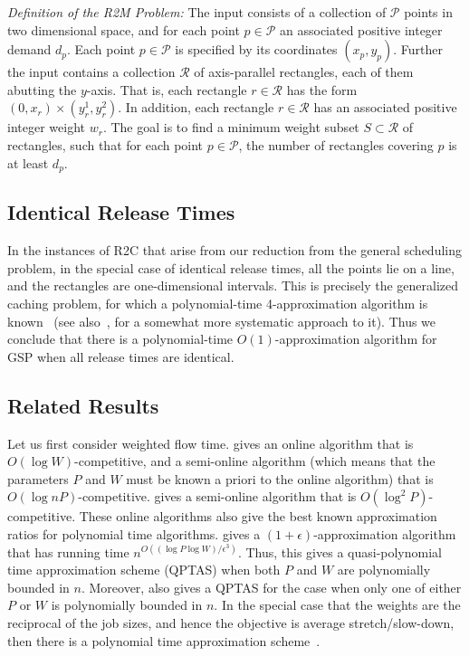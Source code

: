 \documentclass[11pt]{article}
\begin{document}
\medskip

{\em Definition of the R2M Problem:}
The input consists of a collection of ${\mathcal P}$ points in two dimensional space,
and for each point $p \in {\mathcal P}$ an associated positive integer demand $d_p$.
Each point $p\in {\mathcal P}$ is specified by its coordinates $(x_p,y_p)$.
Further the input contains a collection ${\mathcal R}$ of axis-parallel rectangles, 
each of them abutting the $y$-axis. 
That is, each rectangle $r\in {\mathcal R}$ has the form  $(0,x_r) \times (y_r^1,y_r^2)$. 
In addition, each rectangle $r \in {\mathcal R}$ has an associated 
positive integer weight $w_r$.
The goal is to find a minimum weight subset $S \subset {\mathcal R}$ of rectangles, 
such that for each point $p \in {\mathcal P}$, the number of 
rectangles covering $p$ is at least $d_p$.




\subsection{ Identical Release Times}
In the instances of R2C that arise from our reduction from the 
general scheduling problem, in the special case of identical release times,
all the points lie on a line, and the rectangles are one-dimensional intervals.
This is precisely the generalized caching problem, for which a  polynomial-time
4-approximation algorithm is known~\cite{BBF} (see also~\cite{CGK10}, for a somewhat more systematic approach to it). 
Thus we conclude that there is a polynomial-time $O(1)$-approximation 
algorithm for GSP
when all release times are identical.


\subsection{ Related Results}
\label{s:related}
Let us first consider weighted flow time.
\cite{BansalD07}
gives an online algorithm that is 
$O(\log W)$-competitive, and a semi-online algorithm 
(which means that the parameters $P$ and $W$ must be known
a priori to the online algorithm) that 
is $O(\log nP)$-competitive. \cite{ChekuriKZ01} gives a semi-online algorithm that is $O(\log^2 P)$-competitive.
These online algorithms also give the best known approximation ratios 
for polynomial time algorithms.
\cite{ChekuriK02}
gives a $(1+\epsilon)$-approximation algorithm that 
 has running time $n^{O((\log P \log W)/\epsilon^3)}$. 
Thus, this gives a quasi-polynomial time approximation
scheme (QPTAS) when both $P$ and $W$ are polynomially bounded in $n$. 
Moreover, \cite{ChekuriK02} also gives a QPTAS for the case when only one of either $P$ or
$W$ is polynomially bounded in $n$. 
In the special case that the weights are the reciprocal of the job sizes, and hence the objective is
average stretch/slow-down, then there is a polynomial time approximation
scheme~\cite{BenderMR04,ChekuriK02}.
\end{document}
